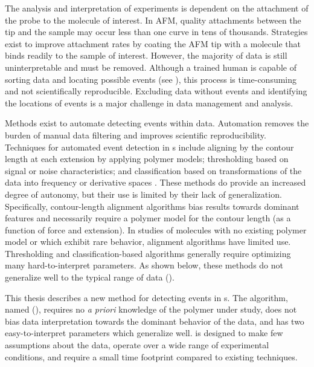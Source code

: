 The analysis and interpretation of \singlemol{} experiments is dependent on the attachment of the probe to the molecule of interest. In AFM, quality attachments between the tip and the sample may occur less than one curve in tens of thousands. Strategies exist to improve attachment rates by coating the AFM tip with a molecule that binds readily to the sample of interest.\cite{walder_robert_rapid_nodate} However, the majority of data is still uninterpretable and must be removed. Although a trained human is capable of sorting \singlemol{} data and locating possible events (see ), this process is time-consuming and not scientifically reproducible. Excluding data without events and identifying the locations of events is a major challenge in \singlemol{} data management and analysis.

Methods exist to automate detecting events within \singlemol{} data. Automation removes the burden of manual data filtering and improves scientific reproducibility. Techniques for automated event detection in \fec{}s include aligning by the contour length at each extension by applying polymer models; thresholding based on signal or noise characteristics; and classification based on transformations of the data into frequency or derivative spaces . These methods do provide an increased degree of autonomy, but their use is limited by their lack of generalization. Specifically, contour-length alignment algorithms bias results towards dominant features and necessarily require a polymer model for the contour length (as a function of force and extension). In \singlemol{} studies of molecules with no existing polymer model or which exhibit rare behavior, alignment algorithms have limited use.  Thresholding and classification-based algorithms generally require optimizing many hard-to-interpret parameters. As shown below, these methods do not generalize well to the typical range of \singlemol{} data ().

This thesis describes a new method for detecting events in \fec{}s.  The algorithm, named \name{} (\acronym{}), requires no \textit{a priori} knowledge of the polymer under study, does not bias data interpretation towards the dominant behavior of the data, and has two easy-to-interpret parameters which generalize well. \name{} is designed to make few assumptions about the data, operate over a wide range of \singlemol{} experimental conditions, and require a small time footprint compared to existing techniques.

